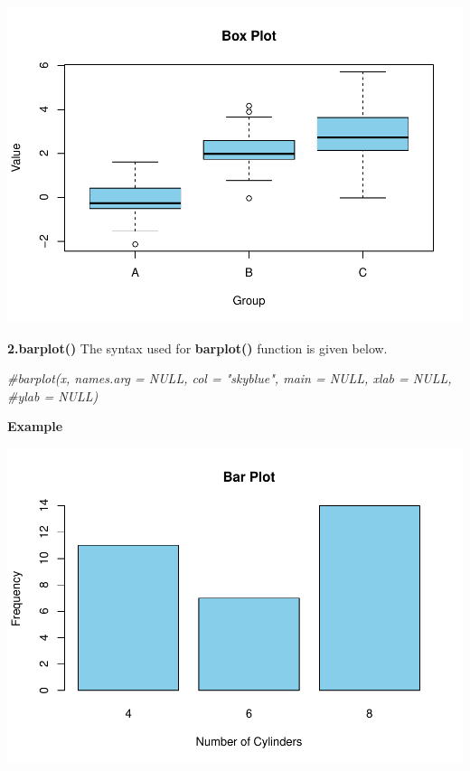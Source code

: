 \documentclass[
]{book}
\newenvironment{Shaded}{\begin{snugshade}}{\end{snugshade}}
\newcommand{\AttributeTok}[1]{\textcolor[rgb]{0.13,0.29,0.53}{#1}}
\newcommand{\CommentTok}[1]{\textcolor[rgb]{0.56,0.35,0.01}{\textit{#1}}}
\newcommand{\FunctionTok}[1]{\textcolor[rgb]{0.13,0.29,0.53}{\textbf{#1}}}
\newcommand{\NormalTok}[1]{#1}
\newcommand{\OtherTok}[1]{\textcolor[rgb]{0.56,0.35,0.01}{#1}}
\newcommand{\SpecialCharTok}[1]{\textcolor[rgb]{0.81,0.36,0.00}{\textbf{#1}}}
\newcommand{\StringTok}[1]{\textcolor[rgb]{0.31,0.60,0.02}{#1}}
\begin{document}
\includegraphics{_main_files/figure-latex/unnamed-chunk-29-1.pdf}

\textbf{2.barplot()}
The syntax used for \textbf{barplot()} function is given below.

\begin{Shaded}
\begin{Highlighting}[]
\CommentTok{\#barplot(x, names.arg = NULL, col = "skyblue", main = NULL, xlab = NULL, \#ylab = NULL)}
\end{Highlighting}
\end{Shaded}

\textbf{Example}

\begin{Shaded}
\end{Shaded}

\includegraphics{_main_files/figure-latex/unnamed-chunk-31-1.pdf}
\end{document}
